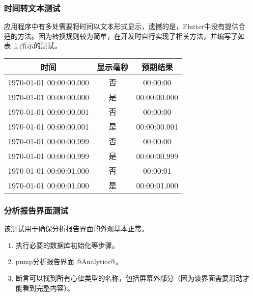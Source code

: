 \subsubsection{时间转文本测试}

应用程序中有多处需要将时间以文本形式显示，遗憾的是，Flutter中没有提供合适的方法。因为转换规则较为简单，在开发时自行实现了相关方法，并编写了如表~\ref{tab:time-to-text} 所示的测试。

\begin{table}[!ht]
    \centering
    \label{tab:time-to-text}
    \begin{tabular}{|c|c|c|}
        \hline
        时间                      & 显示毫秒 & 预期结果         \\
        \hline
        1970-01-01 00:00:00.000 & 否    & 00:00:00     \\
        \hline
        1970-01-01 00:00:00.000 & 是    & 00:00:00.000 \\
        \hline
        1970-01-01 00:00:00.001 & 否    & 00:00:00     \\
        \hline
        1970-01-01 00:00:00.001 & 是    & 00:00:00.001 \\
        \hline
        1970-01-01 00:00:00.999 & 否    & 00:00:00     \\
        \hline
        1970-01-01 00:00:00.999 & 是    & 00:00:00.999 \\
        \hline
        1970-01-01 00:00:01.000 & 否    & 00:00:01     \\
        \hline
        1970-01-01 00:00:01.000 & 是    & 00:00:01.000 \\
        \hline
    \end{tabular}
\end{table}

\subsubsection{分析报告界面测试}

该测试用于确保分析报告界面的外观基本正常。

\begin{enumerate}
    \item 执行必要的数据库初始化等步骤。
    \item pump分析报告界面 @Analytics@。
    \item 断言可以找到所有心律类型的名称，包括屏幕外部分（因为该界面需要滑动才能看到完整内容）。
\end{enumerate}

